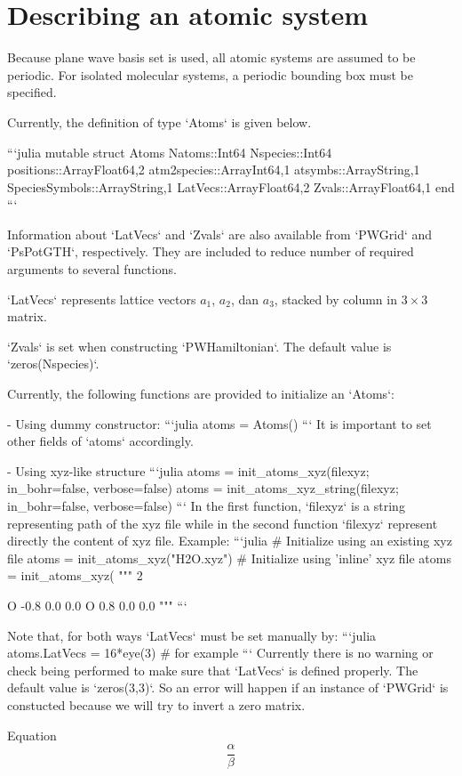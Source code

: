 \section{Describing an atomic system}

\begin{markdown}
Because plane wave basis set is used, all atomic systems are assumed
to be periodic. For isolated molecular systems, a periodic bounding box
must be specified.

Currently, the definition of type `Atoms` is given below.

```julia
mutable struct Atoms
    Natoms::Int64
    Nspecies::Int64
    positions::Array{Float64,2}
    atm2species::Array{Int64,1}
    atsymbs::Array{String,1}
    SpeciesSymbols::Array{String,1}
    LatVecs::Array{Float64,2}
    Zvals::Array{Float64,1}
end
```

Information about `LatVecs` and `Zvals` are also available
from `PWGrid` and `PsPotGTH`, respectively.
They are included to reduce number of required arguments to several functions.

`LatVecs` represents lattice vectors $a_{1}$, $a_{2}$, dan $a_{3}$, stacked by column
in $3\times3$ matrix.

`Zvals` is set when constructing `PWHamiltonian`. The default value is `zeros(Nspecies)`.

Currently, the following functions are provided to initialize an `Atoms`:

- Using dummy constructor:
  ```julia
  atoms = Atoms()
  ```
  It is important to set other fields of `atoms` accordingly.

- Using xyz-like structure
  ```julia
  atoms = init_atoms_xyz(filexyz; in_bohr=false, verbose=false)
  atoms = init_atoms_xyz_string(filexyz; in_bohr=false, verbose=false)
  ```
  In the first function, `filexyz` is a string representing path of the xyz file while
  in the second function `filexyz` represent directly the content of xyz file.
  Example:
  ```julia
  # Initialize using an existing xyz file
  atoms = init_atoms_xyz("H2O.xyz")
  # Initialize using 'inline' xyz file
  atoms = init_atoms_xyz(
  """
  2

  O   -0.8  0.0  0.0
  O    0.8  0.0  0.0
  """
  ```

Note that, for both ways `LatVecs` must be set manually by:
```julia
atoms.LatVecs = 16*eye(3) # for example
```
Currently there is no warning or check being performed to make sure that `LatVecs`
is defined properly. The default value is `zeros(3,3)`. So an error will happen
if an instance of `PWGrid` is constucted because we will try to invert a zero matrix.


Equation
\begin{equation}
\frac{\alpha}{\beta}
\end{equation}


\end{markdown}

